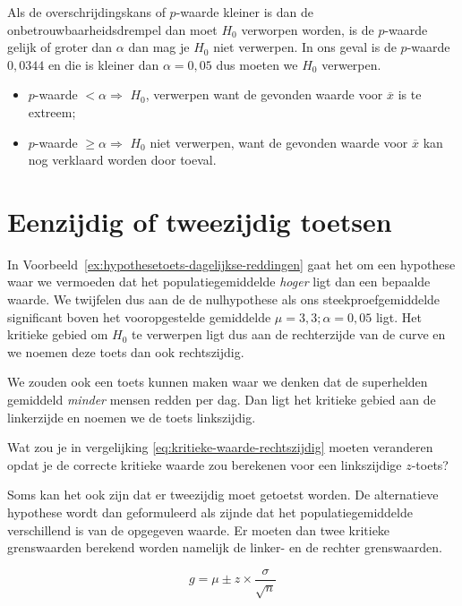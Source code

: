 Als de overschrijdingskans of $p$-waarde kleiner is dan de onbetrouwbaarheidsdrempel dan moet $H_{0}$ verworpen worden, is de $p$-waarde gelijk of groter dan $\alpha$ dan mag je $H_{0}$ niet verwerpen. In ons geval is de $p$-waarde $0,0344$ en die is kleiner dan $\alpha = 0,05$ dus moeten we $H_{0}$ verwerpen.

\begin{itemize}
  \item $p$-waarde $< \alpha \Rightarrow$ $H_{0}$, verwerpen want de gevonden waarde voor $\overline{x}$ is te extreem;
  \item $p$-waarde $\geq \alpha \Rightarrow$ $H_{0}$ niet verwerpen, want de gevonden waarde voor $\overline{x}$ kan nog verklaard worden door toeval.
\end{itemize}

\section{Eenzijdig of tweezijdig toetsen}
\label{sec:eenzijdig-of-tweezijdig}

In Voorbeeld~\ref{ex:hypothesetoets-dagelijkse-reddingen} gaat het om een hypothese waar we vermoeden dat het populatiegemiddelde \emph{hoger} ligt dan een bepaalde waarde. We twijfelen dus aan de de nulhypothese als ons steekproefgemiddelde significant boven het vooropgestelde gemiddelde $\mu = 3,3; \alpha = 0,05$ ligt. Het kritieke gebied om $H_{0}$ te verwerpen ligt dus aan de rechterzijde van de curve en we noemen deze toets dan ook rechtszijdig.

We zouden ook een toets kunnen maken waar we denken dat de superhelden gemiddeld \emph{minder} mensen redden per dag. Dan ligt het kritieke gebied aan de linkerzijde en noemen we de toets linkszijdig.

\begin{exercise}
  \label{ex:kritieke-waarde-linkszijdig}
  Wat zou je in vergelijking \ref{eq:kritieke-waarde-rechtszijdig} moeten veranderen opdat je de correcte kritieke waarde zou berekenen voor een linkszijdige $z$-toets?
\end{exercise}

Soms kan het ook zijn dat er tweezijdig moet getoetst worden. De alternatieve hypothese wordt dan geformuleerd als zijnde dat het populatiegemiddelde verschillend is van de opgegeven waarde. Er moeten dan twee kritieke grenswaarden berekend worden namelijk de linker- en de rechter grenswaarden.

\begin{equation}
  g = \mu \pm z \times \frac{\sigma}{\sqrt{n}}
  \label{eq:kritieke-waarde-tweezijdig}
\end{equation}

